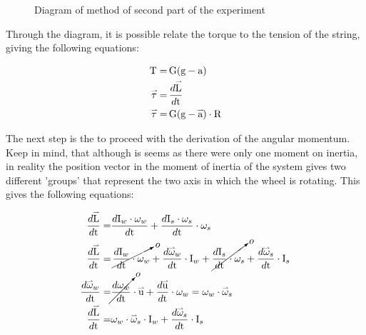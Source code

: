 \documentclass{article}
\newcommand{\myvect}[1]{\accentset{\rightharpoonup}{#1}}
\begin{document}
\begin{figure}[H]
\begin{tikzpicture}[x=0.85pt,y=0.85pt,yscale=-1,xscale=1]
    
    \end{tikzpicture}
\caption{Diagram of method of second part of the experiment} 
\label{fDiagram of method of second part of the experiment}
\end{figure}

Through the diagram, it is possible relate the torque to the tension of the string, giving the following equations:

\begin{equation*}
\begin{aligned}
    \text{T}=&\,\text{G}(\text{g}-\text{a})\\
    \myvect{\tau}=&\,\frac{d\myvect{\text{L}}}{d\text{t}}\\
    \myvect{\tau}=&\,\text{G}(\text{g}-\myvect{\text{a}})\cdot\text{R}\\
\end{aligned}
\end{equation*}

The next step is the to proceed with the derivation of the angular momentum. Keep in mind, that although is seems as there were only one moment on inertia, in reality the position vector in the moment of inertia of the system gives two different 'groups' that represent the two axis in which the wheel is rotating. This gives the following equations:

\begin{equation*}
\begin{aligned}
    \frac{d\myvect{\text{L}}}{d\text{t}}=&\frac{d\text{I}_w\cdot\omega_{w}}{d\text{t}}+\frac{d\text{I}_s\cdot \omega_{s}}{d\text{t}}\cdot \omega_{s}\\
    \frac{d\myvect{\text{L}}}{d\text{t}}=&\,\cancelto{o}{\frac{d\text{I}_w}{d\text{t}}\cdot \omega_{w}} + \frac{d\myvect{\omega}_{w}}{d\text{t}}\cdot\text{I}_w + \cancelto{o}{\frac{d\text{I}_s}{d\text{t}}\cdot \omega_{s}} + \frac{d\myvect{\omega}_{s}}{d\text{t}}\cdot\text{I}_s\\
    \frac{d\myvect{\omega}_{w}}{d\text{t}}=&\cancelto{o}{\frac{d{\omega}_{w}}{d\text{t}}}\cdot\myvect{\text{u}} + \frac{d\myvect{\text{u}}}{d\text{t}}\cdot\omega_{w}= {\omega}_{w} \cdot \myvect{\omega}_{s}\\
    \frac{d\myvect{\text{L}}}{d\text{t}}=& {\omega}_{w} \cdot \myvect{\omega}_{s}\cdot\text{I}_w+\frac{d\myvect{\omega}_{s}}{d\text{t}}\cdot\text{I}_s\\
\end{aligned}
\end{equation*}
\end{document}
